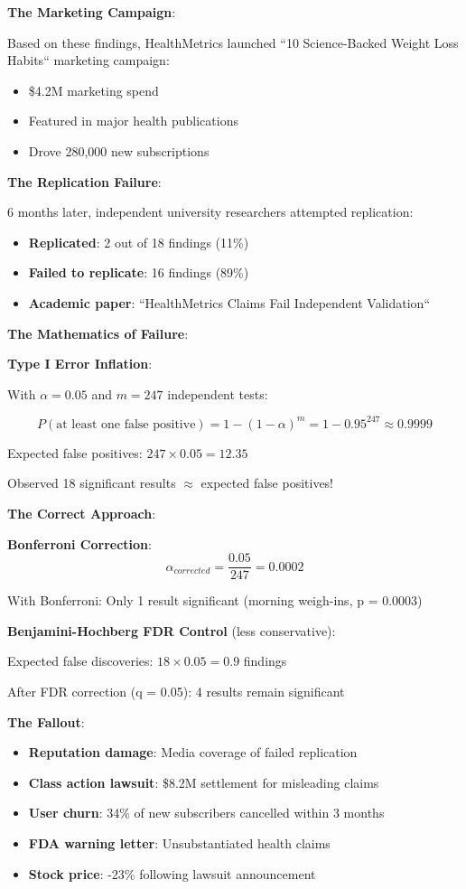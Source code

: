 \textbf{The Marketing Campaign}:

Based on these findings, HealthMetrics launched ``10 Science-Backed Weight Loss Habits`` marketing campaign:
\begin{itemize}
    \item \$4.2M marketing spend
    \item Featured in major health publications
    \item Drove 280,000 new subscriptions
\end{itemize}

\textbf{The Replication Failure}:

6 months later, independent university researchers attempted replication:
\begin{itemize}
    \item \textbf{Replicated}: 2 out of 18 findings (11\%)
    \item \textbf{Failed to replicate}: 16 findings (89\%)
    \item \textbf{Academic paper}: ``HealthMetrics Claims Fail Independent Validation``
\end{itemize}

\textbf{The Mathematics of Failure}:

\textbf{Type I Error Inflation}:

With $\alpha = 0.05$ and $m = 247$ independent tests:

\[
P(\text{at least one false positive}) = 1 - (1 - \alpha)^m = 1 - 0.95^{247} \approx 0.9999
\]

Expected false positives: $247 \times 0.05 = 12.35$

Observed 18 significant results $\approx$ expected false positives!

\textbf{The Correct Approach}:

\textbf{Bonferroni Correction}:
\[
\alpha_{corrected} = \frac{0.05}{247} = 0.0002
\]

With Bonferroni: Only 1 result significant (morning weigh-ins, p = 0.0003)

\textbf{Benjamini-Hochberg FDR Control} (less conservative):

Expected false discoveries: $18 \times 0.05 = 0.9$ findings

After FDR correction (q = 0.05): 4 results remain significant

\textbf{The Fallout}:

\begin{itemize}
    \item \textbf{Reputation damage}: Media coverage of failed replication
    \item \textbf{Class action lawsuit}: \$8.2M settlement for misleading claims
    \item \textbf{User churn}: 34\% of new subscribers cancelled within 3 months
    \item \textbf{FDA warning letter}: Unsubstantiated health claims
    \item \textbf{Stock price}: -23\% following lawsuit announcement
\end{itemize}

